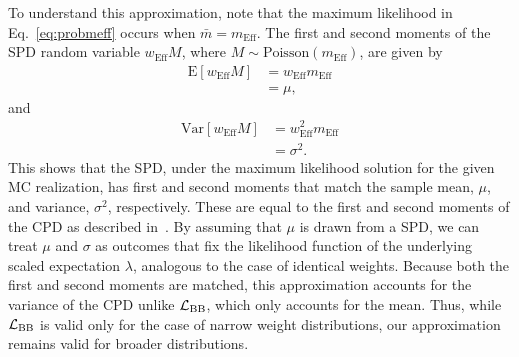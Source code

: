 \documentclass[a4paper, 11pt]{article}
\newcommand{\like}{\mathcal{L}}
\newcommand{\lbarlow}{\like_{\textmd{BB}}}
\newcommand{\meff}{m_\mathrm{Eff}}
\newcommand{\weff}{w_\mathrm{Eff}}
\begin{document}
To understand this approximation, note that the maximum likelihood in Eq.~\eqref{eq:probmeff} occurs when $\bar m = \meff$. The first and second moments of the SPD random variable $\weff M$, where $M \sim \mathrm{Poisson}(\meff)$, are given by
\begin{align}
\mathrm{E}[\weff M] &= \weff \meff \\
&= \mu, \nonumber
\end{align}
and
\begin{align}
\mathrm{Var}[\weff M] &= \weff^2 \meff \\
&= \sigma^2. \nonumber
\end{align}
This shows that the SPD, under the maximum likelihood solution for the given MC realization, has first and second moments that match the sample mean, $\mu$, and variance, $\sigma^2$, respectively. These are equal to the first and second moments of the CPD as described in~\cite{Bohm:2013gla}. By assuming that $\mu$ is drawn from a SPD, we can treat $\mu$ and $\sigma$ as outcomes that fix the likelihood function of the underlying scaled expectation $\lambda$, analogous to the case of identical weights. Because both the first and second moments are matched, this approximation accounts for the variance of the CPD unlike $\lbarlow$, which only accounts for the mean. Thus, while $\lbarlow$ is valid only for the case of narrow weight distributions, our approximation remains valid for broader distributions.
\end{document}
